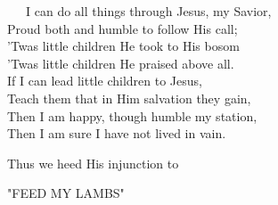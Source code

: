 \documentclass[
]{book}
\begin{document}
~~~I can do all things through Jesus, my Savior,\\
\hspace*{0.333em}\hspace*{0.333em}\hspace*{0.333em}Proud both and humble to follow His call;\\
\hspace*{0.333em}\hspace*{0.333em}\hspace*{0.333em}'Twas little children He took to His bosom\\
\hspace*{0.333em}\hspace*{0.333em}\hspace*{0.333em}'Twas little children He praised above all.\\
\hspace*{0.333em}\hspace*{0.333em}\hspace*{0.333em}If I can lead little children to Jesus,\\
\hspace*{0.333em}\hspace*{0.333em}\hspace*{0.333em}Teach them that in Him salvation they gain,\\
\hspace*{0.333em}\hspace*{0.333em}\hspace*{0.333em}Then I am happy, though humble my station,\\
\hspace*{0.333em}\hspace*{0.333em}\hspace*{0.333em}Then I am sure I have not lived in vain.

Thus we heed His injunction to

\begin{center} "FEED MY LAMBS" \end{center}
\end{document}
